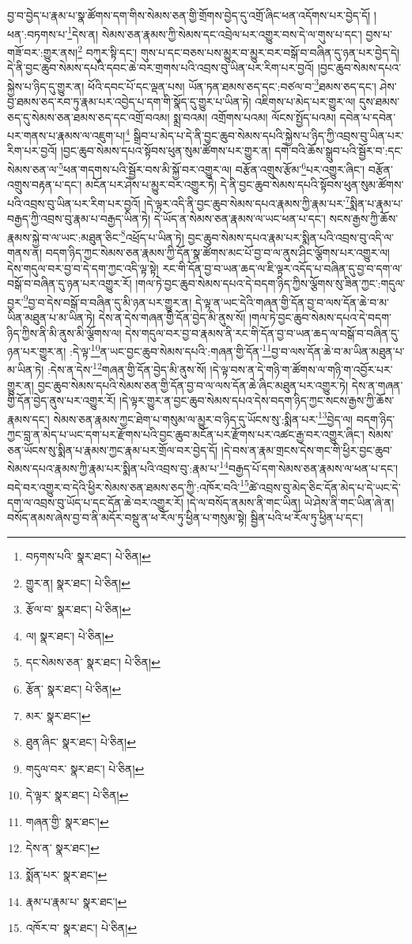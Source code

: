 བྱ་བ་བྱེད་པ་རྣམ་པ་སྣ་ཚོགས་དག་གིས་སེམས་ཅན་གྱི་གྲོགས་བྱེད་དུ་འགྲོ་ཞིང་ཕན་འདོགས་པར་བྱེད་དོ། །ཕན་:བཏགས་པ་\footnote{བཏགས་པའི་  སྣར་ཐང་།  པེ་ཅིན། }དེས་ན། སེམས་ཅན་རྣམས་ཀྱི་སེམས་དང་འབྲེལ་པར་འགྱུར་བས་དེ་ལ་གུས་པ་དང་། བྱས་པ་གཟོ་བར་:གྱུར་ནས།\footnote{གྱུར་ན།  སྣར་ཐང་།  པེ་ཅིན། } བཀུར་སྟི་དང་། གུས་པ་དང་བཅས་པས་མྱུར་བ་མྱུར་བར་བསྒོ་བ་བཞིན་དུ་ཉན་པར་བྱེད་དེ། དེ་ནི་བྱང་ཆུབ་སེམས་དཔའི་དབང་ཆེ་བར་གྲགས་པའི་འབྲས་བུ་ཡིན་པར་རིག་པར་བྱའོ། །བྱང་ཆུབ་སེམས་དཔའ་སྐྱེས་པ་ཉིད་དུ་གྱུར་ན། ཕོའི་དབང་པོ་དང་ལྡན་པས། ཡོན་ཏན་ཐམས་ཅད་དང་:བཙལ་བ་\footnote{རྩོལ་བ་  སྣར་ཐང་།  པེ་ཅིན། }ཐམས་ཅད་དང་། ཤེས་བྱ་ཐམས་ཅད་རབ་ཏུ་རྣམ་པར་འབྱེད་པ་དག་གི་སྣོད་དུ་གྱུར་པ་ཡིན་ཏེ། འཇིགས་པ་མེད་པར་གྱུར་ལ། དུས་ཐམས་ཅད་དུ་སེམས་ཅན་ཐམས་ཅད་དང་འགྲོ་བའམ། སྨྲ་བའམ། འགྲོགས་པའམ། ལོངས་སྤྱོད་པའམ། དབེན་པ་དབེན་པར་གནས་པ་རྣམས་ལ་འཇུག་པ།\footnote{ལ།  སྣར་ཐང་།  པེ་ཅིན། } སྒྲིབ་པ་མེད་པ་དེ་ནི་བྱང་ཆུབ་སེམས་དཔའི་སྐྱེས་པ་ཉིད་ཀྱི་འབྲས་བུ་ཡིན་པར་རིག་པར་བྱའོ། །བྱང་ཆུབ་སེམས་དཔའ་སྟོབས་ཕུན་སུམ་ཚོགས་པར་གྱུར་ན། དགེ་བའི་ཆོས་སྒྲུབ་པའི་སྦྱོར་བ་:དང་སེམས་ཅན་ལ་\footnote{དང་སེམས་ཅན་  སྣར་ཐང་།  པེ་ཅིན། }ཕན་གདགས་པའི་སྦྱོར་བས་མི་སྐྱོ་བར་འགྱུར་ལ། བརྩོན་འགྲུས་རྩོམ་\footnote{རྩོན་  སྣར་ཐང་།  པེ་ཅིན། }པར་འགྱུར་ཞིང་། བརྩོན་འགྲུས་བརྟན་པ་དང་། མངོན་པར་ཤེས་པ་མྱུར་བར་འགྱུར་ཏེ། དེ་ནི་བྱང་ཆུབ་སེམས་དཔའི་སྟོབས་ཕུན་སུམ་ཚོགས་པའི་འབྲས་བུ་ཡིན་པར་རིག་པར་བྱའོ། །དེ་ལྟར་འདི་ནི་བྱང་ཆུབ་སེམས་དཔའ་རྣམས་ཀྱི་རྣམ་པར་\footnote{མར་  སྣར་ཐང་། }སྨིན་པ་རྣམ་པ་བརྒྱད་ཀྱི་འབྲས་བུ་རྣམ་པ་བརྒྱད་ཡིན་ཏེ། དེ་ཡོད་ན་སེམས་ཅན་རྣམས་ལ་ཡང་ཕན་པ་དང་། སངས་རྒྱས་ཀྱི་ཆོས་རྣམས་སྐྱེ་བ་ལ་ཡང་:མཐུན་ཅིང་\footnote{ཐུན་ཞིང་  སྣར་ཐང་།  པེ་ཅིན། }འཕྲོད་པ་ཡིན་ཏེ། བྱང་ཆུབ་སེམས་དཔའ་རྣམ་པར་སྨིན་པའི་འབྲས་བུ་འདི་ལ་གནས་ན། བདག་ཉིད་ཀྱང་སེམས་ཅན་རྣམས་ཀྱི་དོན་སྣ་ཚོགས་མང་པོ་བྱ་བ་ལ་ནུས་ཤིང་ལྕོགས་པར་འགྱུར་ལ། དེས་གདུལ་བར་བྱ་བ་དེ་དག་ཀྱང་འདི་ལྟ་སྟེ། རང་གི་དོན་བྱ་བ་ཡན་ཆད་ལ་ཇི་ལྟར་འདོད་པ་བཞིན་དུ་བྱ་བ་དག་ལ་བསྒོ་བ་བཞིན་དུ་ཉན་པར་འགྱུར་རོ། །གལ་ཏེ་བྱང་ཆུབ་སེམས་དཔའ་དེ་བདག་ཉིད་ཀྱིས་ལྕོགས་སུ་ཟིན་ཀྱང་:གདུལ་བྱར་\footnote{གདུལ་བར་  སྣར་ཐང་།  པེ་ཅིན། }བྱ་བ་དེས་བསྒོ་བ་བཞིན་དུ་མི་ཉན་པར་གྱུར་ན། དེ་ལྟ་ན་ཡང་དེའི་གཞན་གྱི་དོན་བྱ་བ་ལས་དོན་ཆེ་བ་མ་ཡིན་མཐུན་པ་མ་ཡིན་ཏེ། དེས་ན་དེས་གཞན་གྱི་དོན་བྱེད་མི་ནུས་སོ། །གལ་ཏེ་བྱང་ཆུབ་སེམས་དཔའ་དེ་བདག་ཉིད་ཀྱིས་ནི་མི་ནུས་མི་ལྕོགས་ལ། དེས་གདུལ་བར་བྱ་བ་རྣམས་ནི་རང་གི་དོན་བྱ་བ་ཡན་ཆད་ལ་བསྒོ་བ་བཞིན་དུ་ཉན་པར་གྱུར་ན། :དེ་ལྟ་\footnote{དེ་ལྟར་  སྣར་ཐང་།  པེ་ཅིན། }ན་ཡང་བྱང་ཆུབ་སེམས་དཔའི་:གཞན་གྱི་དོན་\footnote{གཞན་གྱི་  སྣར་ཐང་། }བྱ་བ་ལས་དོན་ཆེ་བ་མ་ཡིན་མཐུན་པ་མ་ཡིན་ཏེ། :དེས་ན་དེས་\footnote{དེས་ན་  སྣར་ཐང་། }གཞན་གྱི་དོན་བྱེད་མི་ནུས་སོ། །དེ་ལྟ་བས་ན་དེ་གཉི་ག་ཚོགས་ལ་གཉི་ག་འབྱོར་པར་གྱུར་ན། བྱང་ཆུབ་སེམས་དཔའི་སེམས་ཅན་གྱི་དོན་བྱ་བ་ལ་ལས་དོན་ཆེ་ཞིང་མཐུན་པར་འགྱུར་ཏེ། དེས་ན་གཞན་གྱི་དོན་བྱེད་ནུས་པར་འགྱུར་རོ། །དེ་ལྟར་གྱུར་ན་བྱང་ཆུབ་སེམས་དཔའ་དེས་བདག་ཉིད་ཀྱང་སངས་རྒྱས་ཀྱི་ཆོས་རྣམས་དང་། སེམས་ཅན་རྣམས་ཀྱང་ཐེག་པ་གསུམ་ལ་མྱུར་བ་ཉིད་དུ་ཡོངས་སུ་:སྨིན་པར་\footnote{སྨོན་པར་  སྣར་ཐང་། }བྱེད་ལ། བདག་ཉིད་ཀྱང་བླ་ན་མེད་པ་ཡང་དག་པར་རྫོགས་པའི་བྱང་ཆུབ་མངོན་པར་རྫོགས་པར་འཚང་རྒྱ་བར་འགྱུར་ཞིང་། སེམས་ཅན་ཡོངས་སུ་སྨིན་པ་རྣམས་ཀྱང་རྣམ་པར་གྲོལ་བར་བྱེད་དོ། །དེ་བས་ན་རྣམ་གྲངས་དེས་གང་གི་ཕྱིར་བྱང་ཆུབ་སེམས་དཔའ་རྣམས་ཀྱི་རྣམ་པར་སྨིན་པའི་འབྲས་བུ་:རྣམ་པ་\footnote{རྣམ་པ་རྣམ་པ་  སྣར་ཐང་། }བརྒྱད་པོ་དག་སེམས་ཅན་རྣམས་ལ་ཕན་པ་དང་། བདེ་བར་འགྱུར་བ་དེའི་ཕྱིར་སེམས་ཅན་ཐམས་ཅད་ཀྱི་:འཁོར་བའི་\footnote{འཁོར་བ་  སྣར་ཐང་།  པེ་ཅིན། }ཚེ་འབྲས་བུ་མེད་ཅིང་དོན་མེད་པ་དེ་ཡང་དེ་དག་ལ་འབྲས་བུ་ཡོད་པ་དང་དོན་ཆེ་བར་འགྱུར་རོ། །དེ་ལ་བསོད་ནམས་ནི་གང་ཡིན། ཡེ་ཤེས་ནི་གང་ཡིན་ཞེ་ན། བསོད་ནམས་ཞེས་བྱ་བ་ནི་མདོར་བསྡུ་ན་ཕ་རོལ་ཏུ་ཕྱིན་པ་གསུམ་སྟེ། སྦྱིན་པའི་ཕ་རོལ་ཏུ་ཕྱིན་པ་དང་། 